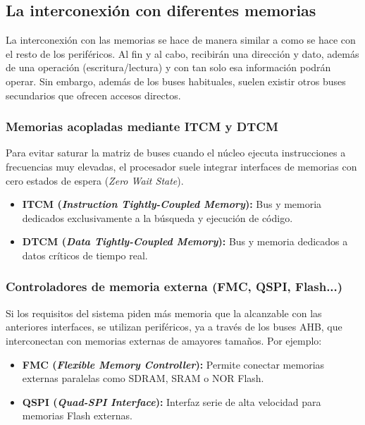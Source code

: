 \documentclass[../main.tex]{subfiles}
\begin{document}
   
        \subsection{La interconexión con diferentes memorias}

            La interconexión con las memorias se hace de manera similar a como se hace con el resto de los periféricos. Al fin y al cabo, recibirán una dirección y dato, además de una operación (escritura/lectura) y con tan solo esa información podrán operar. Sin embargo, además de los buses habituales, suelen existir otros buses secundarios que ofrecen accesos directos.

            \subsubsection{Memorias acopladas mediante ITCM y DTCM}

                Para evitar saturar la matriz de buses cuando el núcleo ejecuta instrucciones a frecuencias muy elevadas, el procesador suele integrar interfaces de memorias con cero estados de espera (\emph{Zero Wait State}).

                \begin{itemize}
                    \item \textbf{ITCM (\emph{Instruction Tightly-Coupled Memory}):} Bus y memoria dedicados exclusivamente a la búsqueda y ejecución de código. 
                    \item \textbf{DTCM (\emph{Data Tightly-Coupled Memory}):} Bus y memoria dedicados a datos críticos de tiempo real.
                \end{itemize}

            \subsubsection{Controladores de memoria externa (FMC, QSPI, Flash...)}
                
                Si los requisitos del sistema piden más memoria que la alcanzable con las anteriores interfaces, se utilizan periféricos, ya a través de los buses AHB, que interconectan con memorias externas de amayores tamaños. Por ejemplo:

                \begin{itemize}
                    \item \textbf{FMC (\emph{Flexible Memory Controller}):} Permite conectar memorias externas paralelas como SDRAM, SRAM o NOR Flash.
                    
                    \item \textbf{QSPI (\emph{Quad-SPI Interface}):} Interfaz serie de alta velocidad para memorias Flash externas. 
                \end{itemize}
\end{document}
